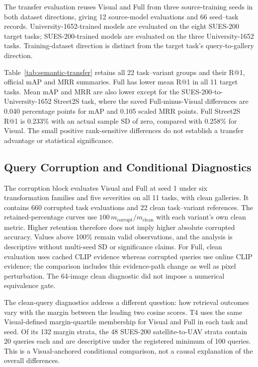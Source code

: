 The transfer evaluation reuses Visual and Full from three source-training
seeds in both dataset directions, giving 12 source-model evaluations and
66 seed--task records. University-1652-trained models are evaluated on the
eight SUES-200 target tasks; SUES-200-trained models are evaluated on the
three University-1652 tasks. Training-dataset direction is distinct from
the target task's query-to-gallery direction.

Table~\ref{tab:semantic-transfer} retains all 22 task--variant groups and
their R@1, official mAP and MRR summaries. Full has lower mean R@1 in all
11 target tasks. Mean mAP and MRR are also lower except for the
SUES-200-to-University-1652 Street2S task, where the saved Full-minus-Visual
differences are 0.040 percentage points for mAP and 0.105 scaled MRR
points. Full Street2S R@1 is 0.233\% with an actual sample SD of zero,
compared with 0.258\% for Visual. The small positive rank-sensitive
differences do not establish a transfer advantage or statistical significance.



\subsection{Query Corruption and Conditional Diagnostics}

The corruption block evaluates Visual and Full at seed 1 under six
transformation families and five severities on all 11 tasks, with clean
galleries. It contains 660 corrupted task evaluations and 22 clean
task--variant references. The retained-percentage curves use
$100\,m_{\mathrm{corrupt}}/m_{\mathrm{clean}}$ with each variant's own clean
metric. Higher retention therefore does not imply higher absolute corrupted
accuracy. Values above 100\% remain valid observations, and the analysis is
descriptive without multi-seed SD or significance claims. For Full, clean
evaluation uses cached CLIP evidence whereas corrupted queries use online
CLIP evidence; the comparison includes this evidence-path change as well as
pixel perturbation. The 64-image clean diagnostic did not impose a numerical
equivalence gate.

The clean-query diagnostics address a different question: how retrieval
outcomes vary with the margin between the leading two cosine scores. T4
uses the same Visual-defined margin-quartile membership for Visual and
Full in each task and seed. Of its 132 margin strata, the 48 SUES-200
satellite-to-UAV strata contain 20 queries each and are descriptive under
the registered minimum of 100 queries. This is a Visual-anchored conditional
comparison, not a causal explanation of the overall differences.

